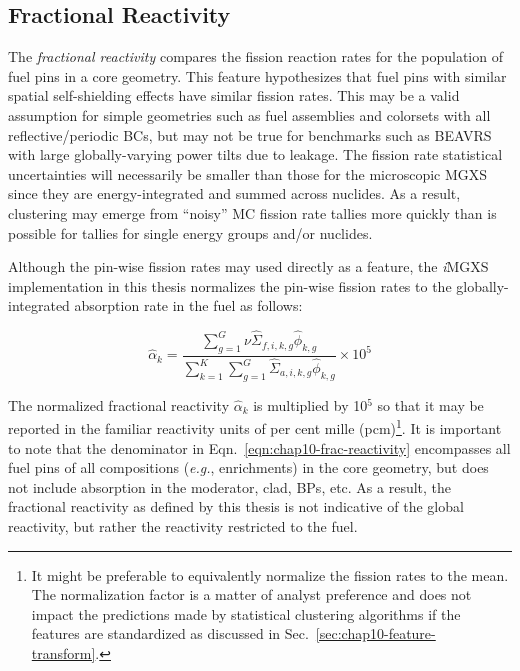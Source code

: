 \clearpage

\subsection{Fractional Reactivity}
\label{subsec:chap10-frac-reactivity}

The \textit{fractional reactivity} compares the fission reaction rates for the population of fuel pins in a core geometry. This feature hypothesizes that fuel pins with similar spatial self-shielding effects have similar fission rates. This may be a valid assumption for simple geometries such as fuel assemblies and colorsets with all reflective/periodic \acp{BC}, but may not be true for benchmarks such as \ac{BEAVRS} with large globally-varying power tilts due to leakage. The fission rate statistical uncertainties will necessarily be smaller than those for the microscopic \ac{MGXS} since they are energy-integrated and summed across nuclides. As a result, clustering may emerge from ``noisy'' \ac{MC} fission rate tallies more quickly than is possible for tallies for single energy groups and/or nuclides.

Although the pin-wise fission rates may used directly as a feature, the \textit{i}\ac{MGXS} implementation in this thesis normalizes the pin-wise fission rates to the globally-integrated absorption rate in the fuel as follows:

\begin{equation}
\label{eqn:chap10-frac-reactivity}
\hat{\alpha}_{k} = \frac{\displaystyle\sum\limits_{g=1}^{G}\nu\hat{\Sigma}_{f,i,k,g}\hat{\phi}_{k,g}}{\displaystyle\sum\limits_{k=1}^{K}\displaystyle\sum\limits_{g=1}^{G}\hat{\Sigma}_{a,i,k,g}\hat{\phi}_{k,g}} \times 10^{5}
\end{equation}

\noindent The normalized fractional reactivity $\hat{\alpha}_{k}$  is multiplied by 10$^{5}$ so that it may be reported in the familiar reactivity units of per cent mille (pcm)\footnote{It might be preferable to equivalently normalize the fission rates to the mean. The normalization factor is a matter of analyst preference and does not impact the predictions made by statistical clustering algorithms if the features are standardized as discussed in Sec.~\ref{sec:chap10-feature-transform}.}. It is important to note that the denominator in Eqn.~\ref{eqn:chap10-frac-reactivity} encompasses all fuel pins of all compositions (\textit{e.g.}, enrichments) in the core geometry, but does not include absorption in the moderator, clad, \acp{BP}, etc. As a result, the fractional reactivity as defined by this thesis is not indicative of the global reactivity, but rather the reactivity restricted to the fuel.

